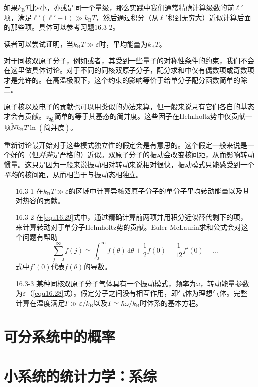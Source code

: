如果$k_\text{B}T$比$\varepsilon$小，亦或是同一个量级，那么实践中我们通常精确计算级数的前$\ell'$项，满足$\ell'(\ell'+1)\gg k_\text{B}T$，然后通过积分（从$\ell'$积到无穷大）近似计算后面的那些项。具体可以参考习题16.3-2。

读者可以尝试证明，当$k_\text{B}T\gg\varepsilon$时，平均能量为$k_\text{B}T$。

对于同核双原子分子，例如或者，其受到一些量子的对称性条件的约束，我们不会在这里做具体讨论。对于不同的同核双原子分子，配分求和中仅有偶数项或奇数项才是允许的。在高温极限下，这个约束的影响等价于给单分子配分函数简单的除二。

原子核以及电子的贡献也可以用类似的办法来算，但一般来说只有它们各自的基态才会有贡献。$z_\text{核}$简单的等于其基态的简并度。这些因子在Helmholtz势中仅贡献一项$\tilde Nk_\text{B}T\ln(\text{简并度})$。

重新讨论最开始对于这些模式独立性的假定会是有意思的。这个假定一般来说是一个好的（但{\it 并非}是严格的）近似。双原子分子的振动会改变核间距，从而影响转动惯量。这只是因为一般来说振动相对转动来说相对很快，振动模式只能感受到一个{\it 平均}的核间距，从而相当于与振动态相独立。

\begin{itemize}
\item[16.3-1] 在$k_\text{B}T\gg \varepsilon$的区域中计算异核双原子分子的单分子平均转动能量以及其对热容的贡献。
\item[16.3-2] 在\eqref{equ16.29}式中，通过精确计算前两项并用积分近似替代剩下的项，来计算转动对于单分子Helmholtz势的贡献。Euler-McLaurin求和公式会对这个问题有帮助
\begin{equation*}
\sum\limits_{j=0}^{\infty}f(j) \simeq \int_0^{\infty}f(\theta)\,\mathrm d\theta +\frac{1}{2}f(0)-\frac{1}{12}f'(0)+\dots
\end{equation*}
式中$f'(0)$代表$f(\theta)$的导数。
\item[16.3-3] 某种同核双原子分子气体具有一个振动模式，频率为$\omega$，转动能量参数为$\varepsilon$（\eqref{equ16.28}式）。假定分子之间没有相互作用，即气体为理想气体。完整计算在温度满足$T\gg \varepsilon/k_\text{B}$以及$T\simeq \hbar\omega/k_\text{B}$时体系的基本方程。
\end{itemize}

\section{可分系统中的概率}\label{sec16.4}

\section{小系统的统计力学：系综}\label{sec16.5}

